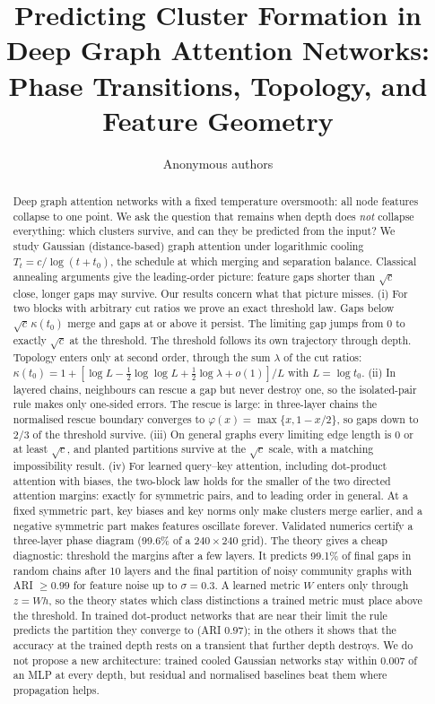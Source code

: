 \documentclass[10pt]{article}
\title{Predicting Cluster Formation in Deep Graph Attention Networks:\\
Phase Transitions, Topology, and Feature Geometry}
\author{Anonymous authors}
\date{}
\theoremstyle{definition}
\theoremstyle{remark}
\begin{document}
\maketitle

\begin{abstract}
Deep graph attention networks with a fixed temperature oversmooth: all node features collapse to one point.
We ask the question that remains when depth does \emph{not} collapse everything: which clusters survive, and
can they be predicted from the input? We study Gaussian (distance-based) graph attention under logarithmic
cooling $T_t=c/\log(t+t_0)$, the schedule at which merging and separation balance. Classical annealing
arguments give the leading-order picture: feature gaps shorter than $\sqrt c$ close, longer gaps may survive.
Our results concern what that picture misses.
(i) For two blocks with arbitrary cut ratios we prove an exact threshold law. Gaps below $\sqrt c\,\kappa(t_0)$
merge and gaps at or above it persist. The limiting gap jumps from $0$ to exactly $\sqrt c$ at the threshold. The
threshold follows its own trajectory through depth. Topology enters only at second order, through the sum
$\lambda$ of the cut ratios: $\kappa(t_0)=1+[\log L-\frac12\log\log L+\frac12\log\lambda+o(1)]/L$ with
$L=\log t_0$.
(ii) In layered chains, neighbours can rescue a gap but never destroy one, so the isolated-pair rule makes only
one-sided errors. The rescue is large: in three-layer chains the normalised rescue boundary converges to
$\varphi(x)=\max\{x,1-x/2\}$, so gaps down to $2/3$ of the threshold survive.
(iii) On general graphs every limiting edge length is $0$ or at least $\sqrt c$, and planted partitions survive at
the $\sqrt c$ scale, with a matching impossibility result.
(iv) For learned query--key attention, including dot-product attention with biases, the two-block law holds for the smaller of the two
directed attention margins: exactly for symmetric pairs, and to leading order in general. At a fixed symmetric part, key biases and key norms
only make clusters merge earlier, and a negative symmetric part makes features oscillate forever.
Validated numerics certify a three-layer phase diagram (99.6\% of a $240\times240$ grid).
The theory gives a cheap diagnostic: threshold the margins after a few layers. It predicts 99.1\% of final gaps in random chains after 10
layers and the final partition of noisy community graphs with ARI $\ge0.99$ for feature noise up to $\sigma=0.3$. A learned metric $W$ enters
only through $z=Wh$, so the theory states which class distinctions a trained metric must place above the threshold. In trained dot-product
networks that are near their limit the rule predicts the partition they converge to (ARI $0.97$); in the others it shows that the accuracy
at the trained depth rests on a transient that further depth destroys. We do not propose a new architecture: trained cooled Gaussian networks stay
within $0.007$ of an MLP at every depth, but residual and normalised baselines beat them where propagation helps.
\end{abstract}
\end{document}
